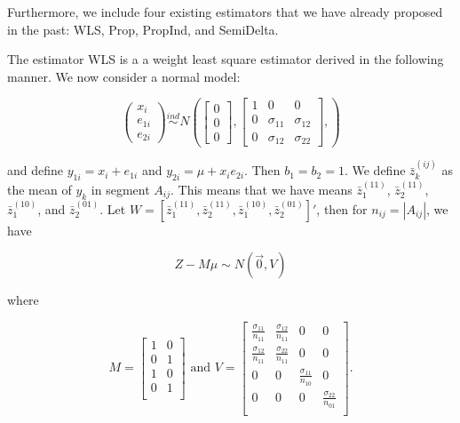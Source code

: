 \documentclass[
  letterpaper,
  DIV=11,
  numbers=noendperiod]{scrartcl}
\begin{document}
Furthermore, we include four existing estimators that we have already
proposed in the past: WLS, Prop, PropInd, and SemiDelta.

The estimator WLS is a a weight least square estimator derived in the
following manner. We now consider a normal model:

\[ 
  \begin{pmatrix}
    x_i \\ e_{1i} \\ e_{2i}
  \end{pmatrix} \stackrel{ind}{\sim}
  N \left(
  \begin{bmatrix}
    0 \\ 0 \\ 0
  \end{bmatrix},
  \begin{bmatrix}
    1 & 0 & 0 \\
    0 & \sigma_{11} & \sigma_{12} \\ 
    0 & \sigma_{12} & \sigma_{22}
  \end{bmatrix},
  \right)
\]

and define \(y_{1i} = x_i + e_{1i}\) and \(y_{2i} = \mu + x_i e_{2i}\).
Then \(b_1 = b_2 = 1\). We define \(\bar z_k^{(ij)}\) as the mean of
\(y_k\) in segment \(A_{ij}\). This means that we have means
\(\bar z_1^{(11)}\), \(\bar z_2^{(11)}\), \(\bar z_1^{(10)}\), and
\(\bar z_2^{(01)}\). Let
\(W = [\bar z_1^{(11)}, \bar z_2^{(11)}, \bar z_1^{(10)}, \bar z_2^{(01)}]'\),
then for \(n_{ij} = |A_{ij}|\), we have

\[Z - M \mu \sim N(\vec 0, V)\]

where

\[M = 
  \begin{bmatrix}
    1 & 0 \\
    0 & 1 \\
    1 & 0 \\
    0 & 1 \\
  \end{bmatrix}
  \text{ and }
  V = 
  \begin{bmatrix}
    \frac{\sigma_{11}}{n_{11}} & \frac{\sigma_{12}}{n_{11}} & 0 & 0 \\
    \frac{\sigma_{12}}{n_{11}} & \frac{\sigma_{22}}{n_{11}} & 0 & 0 \\
    0 & 0 & \frac{\sigma_{11}}{n_{10}} & 0 \\
    0 & 0 & 0 & \frac{\sigma_{22}}{n_{01}} \\
  \end{bmatrix}.
\]
\end{document}
